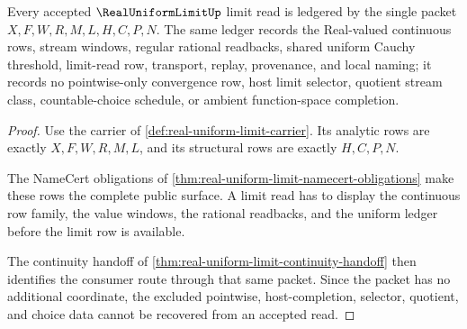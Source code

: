 \begin{theorem}
\label{thm:real-uniform-limit-ledger-exactness}
Every accepted $\RealUniformLimitUp$ limit read is ledgered by the single packet $X,F,W,R,M,L,H,C,P,N$. The same ledger records the Real-valued continuous rows, stream windows, regular rational readbacks, shared uniform Cauchy threshold, limit-read row, transport, replay, provenance, and local naming; it records no pointwise-only convergence row, host limit selector, quotient stream class, countable-choice schedule, or ambient function-space completion.
\end{theorem}
\begin{proof}
Use the carrier of \autoref{def:real-uniform-limit-carrier}. Its analytic rows are exactly $X,F,W,R,M,L$, and its structural rows are exactly $H,C,P,N$.

The NameCert obligations of \autoref{thm:real-uniform-limit-namecert-obligations} make these rows the complete public surface. A limit read has to display the continuous row family, the value windows, the rational readbacks, and the uniform ledger before the limit row is available.

The continuity handoff of \autoref{thm:real-uniform-limit-continuity-handoff} then identifies the consumer route through that same packet. Since the packet has no additional coordinate, the excluded pointwise, host-completion, selector, quotient, and choice data cannot be recovered from an accepted read.
\end{proof}




